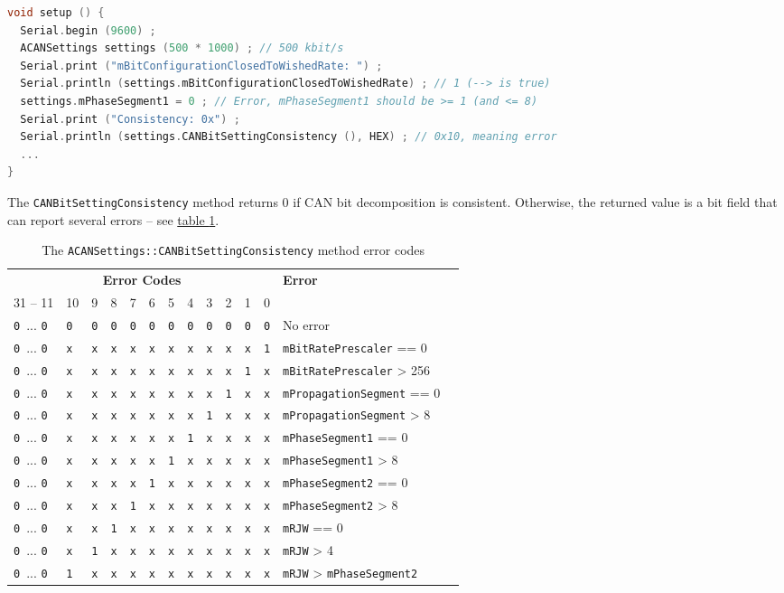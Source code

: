 \documentclass[10pt, a4paper, obeyspaces, openany]{extarticle}
\newcommand\labelTableau[1]{\label{tab:#1}}
\newcommand\refTableau[1]{\hyperref[tab:#1]{table \ref*{tab:#1}}}
\begin{document}
{ \small\begin{lstlisting}[language=c++]
void setup () {
  Serial.begin (9600) ;
  ACANSettings settings (500 * 1000) ; // 500 kbit/s
  Serial.print ("mBitConfigurationClosedToWishedRate: ") ;
  Serial.println (settings.mBitConfigurationClosedToWishedRate) ; // 1 (--> is true)
  settings.mPhaseSegment1 = 0 ; // Error, mPhaseSegment1 should be >= 1 (and <= 8)
  Serial.print ("Consistency: 0x") ;
  Serial.println (settings.CANBitSettingConsistency (), HEX) ; // 0x10, meaning error
  ...
}
\end{lstlisting}}

The \texttt{CANBitSettingConsistency} method returns $0$ if CAN bit decomposition is consistent. Otherwise, the returned value is a bit field that can report several errors -- see \refTableau{CANBitSettingConsistencyErrorCode}.

\begin{table}[!ht]
  \newcommand\zero{\texttt{0}}
  \newcommand\X{\texttt{x}}
  \small
  \onehalfspacing
  \centering
  \begin{tabular}{llllllllllllll}
    \multicolumn{12}{c}{\textbf{Error Codes}} & \textbf{Error}\\
    31 -- 11 & 10 & 9 & 8 & 7 & 6 & 5 & 4 & 3 & 2 & 1 & 0 & \\
    \zero~...  \zero &\zero &\zero &\zero &\zero &\zero &\zero &\zero &\zero &\zero &\zero &\zero & No error \\
    \zero~...  \zero &\X &\X &\X &\X &\X &\X &\X &\X &\X &\X &\texttt{1} & \texttt{mBitRatePrescaler} == 0\\
    \zero~...  \zero &\X &\X &\X &\X &\X &\X &\X &\X &\X &\texttt{1}&\X & \texttt{mBitRatePrescaler} > 256\\
    \zero~...  \zero &\X &\X &\X &\X &\X &\X &\X &\X &\texttt{1}&\X &\X & \texttt{mPropagationSegment} == 0\\
    \zero~...  \zero &\X &\X &\X &\X &\X &\X &\X &\texttt{1}&\X &\X &\X & \texttt{mPropagationSegment} > 8\\
    \zero~...  \zero &\X &\X &\X &\X &\X &\X &\texttt{1}&\X &\X &\X &\X & \texttt{mPhaseSegment1} == 0\\
    \zero~...  \zero &\X &\X &\X &\X &\X &\texttt{1}&\X &\X &\X &\X &\X & \texttt{mPhaseSegment1} > 8\\
    \zero~...  \zero &\X &\X &\X &\X &\texttt{1}&\X &\X &\X &\X &\X &\X & \texttt{mPhaseSegment2} == 0\\
    \zero~...  \zero &\X &\X &\X &\texttt{1}&\X &\X &\X &\X &\X &\X &\X & \texttt{mPhaseSegment2} > 8\\
    \zero~...  \zero &\X &\X &\texttt{1}&\X &\X &\X &\X &\X &\X &\X &\X & \texttt{mRJW} == 0\\
    \zero~...  \zero &\X &\texttt{1}&\X &\X &\X &\X &\X &\X &\X &\X &\X & \texttt{mRJW} > 4\\
    \zero~...  \zero &\texttt{1}&\X &\X &\X &\X &\X &\X &\X &\X &\X &\X & \texttt{mRJW} > \texttt{mPhaseSegment2}\\
  \end{tabular}
  \caption{The \texttt{ACANSettings::CANBitSettingConsistency} method error codes}
  \labelTableau{CANBitSettingConsistencyErrorCode}
\end{table}
\end{document}

